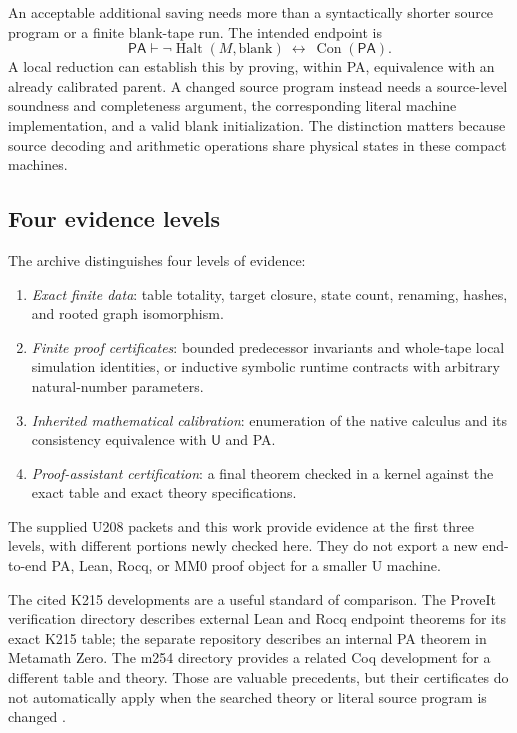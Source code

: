 \documentclass[11pt,a4paper]{article}
\newcommand{\PA}{\mathsf{PA}}
\newcommand{\UU}{\mathsf{U}}
\newcommand{\Con}{\operatorname{Con}}
\newcommand{\Halt}{\operatorname{Halt}}
\newcommand{\file}[1]{\path{#1}}
\begin{document}
An acceptable additional saving needs more than a syntactically shorter
source program or a finite blank-tape run. The intended endpoint is
\begin{equation}\label{eq:endpoint}
 \PA\vdash\neg\Halt(M,\mathrm{blank})\ \longleftrightarrow\ \Con(\PA).
\end{equation}
A local reduction can establish this by proving, within PA, equivalence
with an already calibrated parent. A changed source program instead needs
a source-level soundness and completeness argument, the corresponding
literal machine implementation, and a valid blank initialization. The
distinction matters because source decoding and arithmetic operations share
physical states in these compact machines.

\subsection{Four evidence levels}

The archive distinguishes four levels of evidence:
\begin{enumerate}
\item \emph{Exact finite data}: table totality, target closure, state count,
renaming, hashes, and rooted graph isomorphism.
\item \emph{Finite proof certificates}: bounded predecessor invariants and
whole-tape local simulation identities, or inductive symbolic runtime
contracts with arbitrary natural-number parameters.
\item \emph{Inherited mathematical calibration}: enumeration of the native
calculus and its consistency equivalence with $\UU$ and PA.
\item \emph{Proof-assistant certification}: a final theorem checked in a
kernel against the exact table and exact theory specifications.
\end{enumerate}
The supplied U208 packets and this work provide evidence at the first three
levels, with different portions newly checked here. They do not export a
new end-to-end PA, Lean, Rocq, or MM0 proof object for a smaller U machine.

The cited K215 developments are a useful standard of comparison. The
ProveIt verification directory describes external Lean and Rocq endpoint
theorems for its exact K215 table; the separate \file{k215-pa} repository
describes an internal PA theorem in Metamath Zero. The m254 directory
provides a related Coq development for a different table and theory.
Those are valuable precedents, but their certificates do not automatically
apply when the searched theory or literal source program is changed
\cite{k215verify,k215pa,m254}.
\end{document}
